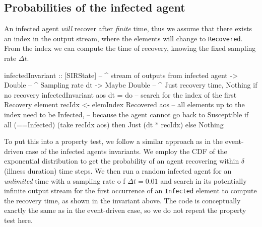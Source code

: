 \subsection{Probabilities of the infected agent}
An infected agent \textit{will} recover after \textit{finite} time, thus we assume that there exists an index in the output stream, where the elements will change to \texttt{Recovered}. From the index we can compute the time of recovery, knowing the fixed sampling rate $\Delta t$.

\begin{HaskellCode}
infectedInvariant :: [SIRState]   -- ^ stream of outputs from infected agent
                  -> Double       -- ^ Sampling rate dt
                  -> Maybe Double -- ^ Just recovery time, Nothing if no recovery
infectedInvariant aos dt  = do
  -- search for the index of the first Recovery element
  recIdx <- elemIndex Recovered aos
  -- all elements up to the index need to be Infected,
  -- because the agent cannot go back to Susceptible
  if all (==Infected) (take recIdx aos)
    then Just (dt * recIdx)
    else Nothing
\end{HaskellCode}

To put this into a property test, we follow a similar approach as in the event-driven case of the infected agents invariants. We employ the CDF of the exponential distribution to get the probability of an agent recovering within $\delta$ (illness duration) time steps. We then run a random infected agent for an \textit{unlimited} time with a sampling rate o f $\Delta t = 0.01$ and search in its potentially infinite output stream for the first occurrence of an \texttt{Infected} element to compute the recovery time, as shown in the invariant above. The code is conceptually exactly the same as in the event-driven case, so we do not repeat the property test here.

%
%
%

